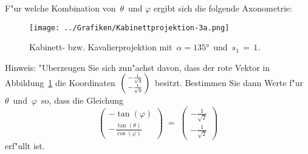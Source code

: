 \begin{Aufgabe}
\begin{Teilaufgaben}
\item F"ur welche Kombination von\, $\theta$\, und  $\varphi$ ergibt sich die folgende Axonometrie:
 \begin{figure}[ht]
  \centering
  \texttt{[image: ../Grafiken/Kabinettprojektion-3a.png]}
  \caption{Kabinett- bzw. Kavalierprojektion mit\, $\alpha = \ang{135}$\, und \,$s_1\, =\,1$.}
  \label{Kabinettproj}
  \end{figure}

  Hinweis: "Uberzeugen Sie sich zun"achst davon, dass der rote Vektor in Abbildung~\ref{Kabinettproj} die Koordinaten\, $\begin{psmallmatrix} - \frac{1}{\sqrt{2}}\\ - \frac{1}{\sqrt{2}} \end{psmallmatrix}$\, besitzt. Bestimmen Sie dann Werte f"ur\, $\theta$\, und\, $\varphi$\, so, dass die Gleichung \[\begin{pmatrix} - \tan(\varphi) \\ - \frac{\tan(\theta)}{\cos(\varphi)} \end{pmatrix}\;=\;\begin{pmatrix} - \frac{1}{\sqrt{2}}\\ - \frac{1}{\sqrt{2}} \end{pmatrix}\] erf"ullt ist.
\end{Teilaufgaben}
\end{Aufgabe}
%